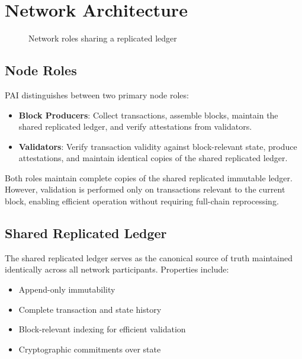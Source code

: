 \documentclass[11pt,a4paper]{article}
\begin{document}
\section{Network Architecture}
\begin{figure}[H]
\centering
{}
\caption{Network roles sharing a replicated ledger}
\label{fig:network}
\end{figure}

\subsection{Node Roles}
PAI distinguishes between two primary node roles:

\begin{itemize}
\item \textbf{Block Producers}: Collect transactions, assemble blocks, maintain the shared replicated ledger, and verify attestations from validators.
\item \textbf{Validators}: Verify transaction validity against block-relevant state, produce attestations, and maintain identical copies of the shared replicated ledger.
\end{itemize}

Both roles maintain complete copies of the shared replicated immutable ledger. However, validation is performed only on transactions relevant to the current block, enabling efficient operation without requiring full-chain reprocessing.

\subsection{Shared Replicated Ledger}
The shared replicated ledger serves as the canonical source of truth maintained identically across all network participants. Properties include:
\begin{itemize}
\item Append-only immutability
\item Complete transaction and state history
\item Block-relevant indexing for efficient validation
\item Cryptographic commitments over state
\end{itemize}
\end{document}
